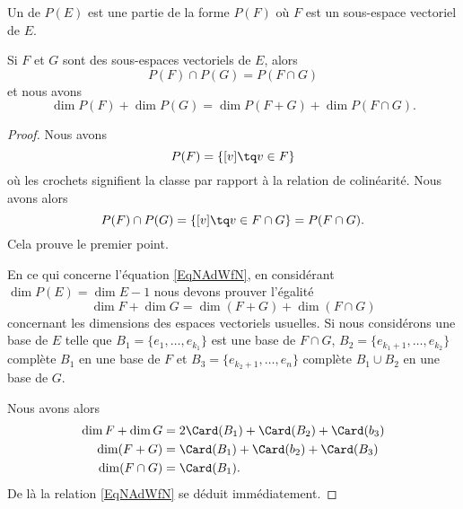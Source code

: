 Un  de \( P(E)\) est une partie de la forme \( P(F)\) où \( F\) est un sous-espace vectoriel de \( E\).

\begin{proposition}     \label{PropuqpWVx}
	Si \( F\) et \( G\) sont des sous-espaces vectoriels de \( E\), alors
	\begin{equation}
		P(F)\cap P(G)=P(F\cap G)
	\end{equation}
	et nous avons
	\begin{equation}        \label{EqNAdWfN}
		\dim P(F)+\dim P(G)=\dim P(F+G)+\dim P(F\cap G).
	\end{equation}
\end{proposition}

\begin{proof}
	Nous avons
	\begin{equation}
		P(F)=\{ [v]\tq v\in F \}
	\end{equation}
	où les crochets signifient la classe par rapport à la relation de colinéarité. Nous avons alors
	\begin{equation}
		P(F)\cap P(G)=\{ [v]\tq v\in F\cap G \}=P(F\cap G).
	\end{equation}
	Cela prouve le premier point.

	En ce qui concerne l'équation \eqref{EqNAdWfN}, en considérant \( \dim P(E)=\dim E-1\) nous devons prouver l'égalité
	\begin{equation}
		\dim F+\dim G=\dim (F+G)+\dim(F\cap G)
	\end{equation}
	concernant les dimensions des espaces vectoriels usuelles. Si nous considérons une base de \( E\) telle que \( B_1=\{ e_1,\ldots, e_{k_1} \}\) est une base de \( F\cap G\), \( B_2=\{ e_{k_1+1},\ldots, e_{k_2} \}\) complète \( B_1\) en une base de \( F\) et \( B_3=\{ e_{k_2+1},\ldots, e_n \}\) complète \( B_1\cup B_2\) en une base de \( G\).

	Nous avons alors
	\begin{subequations}
		\begin{align}
			\dim F+\dim G & =2\Card(B_1)+\Card(B_2)+\Card(b_3) \\
			\dim(F+G)     & =\Card(B_1)+\Card(b_2)+\Card(B_3)  \\
			\dim(F\cap G) & =\Card(B_1).
		\end{align}
	\end{subequations}
	De là la relation \eqref{EqNAdWfN} se déduit immédiatement.
\end{proof}

